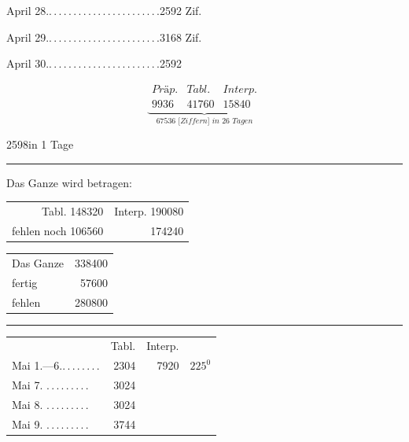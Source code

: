 \noindent{} April 28.\nobreak\hspace{.2em}\mbox{.\,.\,.\,.\,.\,.\,.\,.\,.\,.\,.\,.\,.\,.\,.\,.\,.\,.\,.\,.\,.\,.\,.}\hfill 2592 Zif.\par
\noindent{} April 29.\nobreak\hspace{.2em}\mbox{.\,.\,.\,.\,.\,.\,.\,.\,.\,.\,.\,.\,.\,.\,.\,.\,.\,.\,.\,.\,.\,.\,.}\hfill 3168 Zif.\par
\noindent{} April 30.\nobreak\hspace{.2em}\mbox{.\,.\,.\,.\,.\,.\,.\,.\,.\,.\,.\,.\,.\,.\,.\,.\,.\,.\,.\,.\,.\,.\,.}\hfill 2592\par
\[
\underbrace{\begin{array}{ccc}
\textit{Präp.}&\textit{Tabl.}&\textit{Interp.}\\
\mathit{9936}&\mathit{41760}&\mathit{15840}
\end{array}}_{\textstyle\textit{67536 [Ziffern] in 26 Tagen}}
\]
\begin{center}2598\qquad in 1 Tage\par\smallskip\rule{.25\linewidth}{.3pt}\end{center}
\noindent Das Ganze wird betragen:
\begin{center}
\begin{tabular}{@{}rr@{}}
Tabl. 148320&Interp. 190080\\
fehlen noch 106560&174240
\end{tabular}\par\smallskip
\begin{tabular}{@{}lr@{}}
Das Ganze&338400\\
fertig&57600\\
fehlen&280800
\end{tabular}\par\smallskip\rule{.25\linewidth}{.3pt}
\end{center}
\begin{center}
\begin{tabular}{@{}p{.36\linewidth}rrl@{}}
&Tabl.&Interp.&\\
Mai 1.—6.\nobreak\hspace{.2em}\mbox{.\,.\,.\,.\,.\,.\,.\,.}\hfill&2304&7920&\(\mathit{225}^0\)\\
Mai 7. \BJournalDay{♃}\nobreak\hspace{.2em}\mbox{.\,.\,.\,.\,.\,.\,.\,.\,.}\hfill&3024&&\\
Mai 8. \BJournalDay{♀}\nobreak\hspace{.2em}\mbox{.\,.\,.\,.\,.\,.\,.\,.\,.}\hfill&3024&&\\
Mai 9. \BJournalDay{♄}\nobreak\hspace{.2em}\mbox{.\,.\,.\,.\,.\,.\,.\,.\,.}\hfill&3744&&
\end{tabular}
\end{center}
